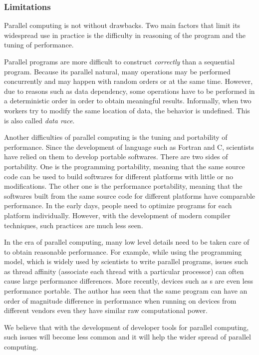 \subsubsection{Limitations}
\label{ssub:Limitations}

Parallel computing is not without drawbacks. Two main factors that limit its
widespread use in practice is the difficulty in reasoning of the program and
the tuning of performance.

Parallel programs are more difficult to construct \emph{correctly} than a
sequential program. Because its parallel natural, many operations may be
performed concurrently and may happen with random orders or at the same time.
However, due to reasons such as data dependency, some operations have to be
performed in a deterministic order in order to obtain meaningful results.
Informally, when two workers try to modify the same location of data, the
behavior is undefined. This is also called \emph{data race}.

Another difficulties of parallel computing is the tuning and portability of
performance. Since the development of language such as Fortran and C,
scientists have relied on them to develop portable softwares. There are two
sides of portability. One is the programming portability, meaning that the
same source code can be used to build softwares for different platforms with
little or no modifications. The other one is the performance portability,
meaning that the softwares built from the same source code for different
platforms have comparable performance. In the early days, people need to
optimize programs for each platform individually. However, with the
development of modern compiler techniques, such practices are much less seen.

In the era of parallel computing, many low level details need to be taken care
of to obtain reasonable performance. For example, while using the \openmp
programming model, which is widely used by scientists to write parallel
programs, issues such as thread affinity (associate each thread with a
particular processor) can often cause large performance differences. More
recently, devices such as \gpu{}s are even less performance portable. The
author has seen that the same \opencl \cite{opencl} program can have an order
of magnitude difference in performance when running on devices from different
vendors even they have similar raw computational power.

We believe that with the development of developer tools for parallel
computing, such issues will become less common and it will help the wider
spread of parallel computing.

